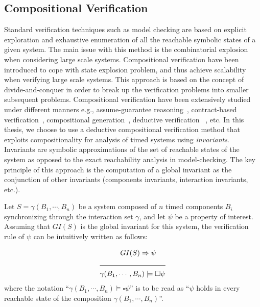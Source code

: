 \subsection{Compositional Verification}

Standard verification techniques such as model checking are based on explicit 
exploration and exhaustive enumeration of all the reachable symbolic states 
of a given system. The main issue with this 
method is the combinatorial explosion when considering large scale systems.
Compositional verification have been introduced to cope with state explosion
problem, and thus achieve scalability when verifying large scale systems.
This approach is based on the concept of divide-and-conquer in order to 
break up the verification
problems into smaller subsequent problems. Compositional verification have been 
extensively studied under different manners e.g., assume-guarantee 
reasoning~\cite{}, 
contract-based verification~\cite{}, compositional generation~\cite{}, 
deductive verification
~\cite{}, etc.  
In this thesis, we choose to use a deductive compositional verification 
method that exploits compositionality for analysis of timed systems 
using \emph{invariants}. Invariants are symbolic approximations of the set 
of reachable states of the system as opposed to the exact 
reachability analysis in model-checking. The key principle of this 
approach is the computation of a global invariant as the conjunction of
other invariants (components invariants, interaction invariants, etc.).




Let $S=\gamma(B_1,\cdots,B_n)$ be a system composed of $n$ timed components $B_i$ 
synchronizing through the interaction 
set $\gamma$, and let $\psi$ be a property of interest. Assuming that 
$GI(S)$ is the global invariant for this system, 
the verification rule of $\psi$ can be intuitively
written as follows:

\begin{align*}
  &\hspace{1cm}GI(S)\Rightarrow\psi\\
    \cline{1-2}
   &\gamma(B_1,\cdots,B_n)\models\square\psi
\end{align*}
where the notation \enquote{$\gamma(B_1,\cdots,B_n)\models\square\psi$} is to 
be read as \enquote{$\psi$ holds in every reachable state of the
composition $\gamma(B_1,\cdots,B_n)$}.

